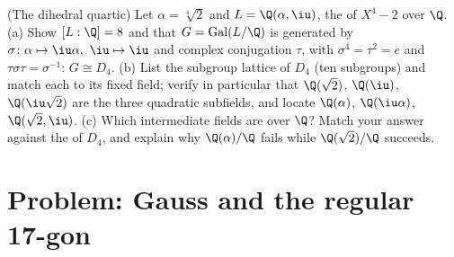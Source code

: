 \begin{exercise}[$\star\star\star$]\label{exo:b3:galois:12}
(The dihedral quartic) Let $\alpha = \sqrt[4]2$ and $L =
\Q(\alpha, \iu)$, the  of $X^4 - 2$ over $\Q$.
(a) Show $[L : \Q] = 8$ and that $G =
\operatorname{Gal}(L/\Q)$ is generated by $\sigma\colon
\alpha \mapsto \iu\alpha,\ \iu \mapsto \iu$ and complex
conjugation $\tau$, with $\sigma^4 = \tau^2 = e$ and
$\tau\sigma\tau = \sigma^{-1}$: $G \cong D_4$.
(b) List the subgroup lattice of $D_4$ (ten subgroups) and
match each to its fixed field; verify in particular that
$\Q(\sqrt2)$, $\Q(\iu)$, $\Q(\iu\sqrt2)$ are the three
quadratic subfields, and locate $\Q(\alpha)$,
$\Q(\iu\alpha)$, $\Q(\sqrt2, \iu)$.
(c) Which intermediate fields are  over $\Q$? Match
your answer against the  of $D_4$, and
explain why $\Q(\alpha)/\Q$ fails while $\Q(\sqrt2)/\Q$
succeeds.
\end{exercise}

\section{Problem: Gauss and the regular 17-gon}

